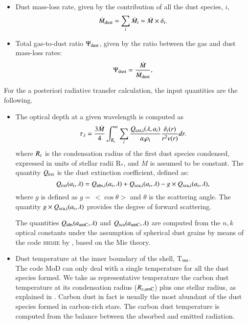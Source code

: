 \documentclass[useAMS,usenatbib]{mn2e/mn2e}
\begin{document}
\begin{itemize}
\item Dust mass-loss rate, given by the contribution of all the dust species, $i$,
\begin{equation}\label{d_mloss}
\dot{M}_{\rm dust}=\sum_i \dot{M}_i=\dot{M}\times\delta_i.
\end{equation}
\item Total gas-to-dust ratio $\Psi_{\rm dust}$, given by the ratio between the gas and dust mass-loss rates:
\begin{equation}\label{psi_dust}
\Psi_{\rm dust}=\frac{\dot{M}}{\dot{M}_{\rm dust}},
\end{equation}
\end{itemize}
\vskip 3mm
For the a posteriori radiative transfer calculation, the input quantities are the following.
\begin{itemize}
\item The optical depth at a given wavelength is computed as
\begin{equation}\label{tau_lambda}
\tau_\lambda=\frac{3\dot{M}}{4}\int_{R_{\rm c}}^{\infty} \sum_i \frac{Q_{\rm ext, i}(\lambda,a_i)}{a_i \rho_{\rm i}}\frac{\delta_i(r)}{r^2 v(r)}dr.
\end{equation}
%
where $R_{\rm c}$ is the condensation radius of the first dust species condensed, expressed in units of stellar radii R$_*$, and $\dot{M}$ is assumed to be constant.
The quantity $Q_{\rm ext}$ is the dust extinction coefficient, defined as:
\begin{equation}
Q_{\rm ext}(a_{\rm i}, \lambda)= Q_{\rm abs, i}(a_{\rm i},\lambda)+ Q_{\rm sca, i}(a_{\rm i}, \lambda) -g \times Q_{\rm sca, i}(a_{\rm i}, \lambda),
\end{equation}
%
where $g$ is defined as $g=$\,$<\cos\theta>$ and $\theta$ is the scattering angle. The quantity $g \times Q_{\rm sca, i}(a_{\rm i}, \lambda)$ provides the degree of forward scattering.

The quantities $Q_{\rm abs}(a_{\rm amC}, \lambda)$ and $Q_{\rm sca}(a_{\rm amC}, \lambda)$ are computed from the $n, k$ optical constants under the assumption of spherical dust grains by means of the code \textsc{bhmie} by \citet{Bohren83}, based on the Mie theory.

\item Dust temperature at the inner boundary of the shell, T$_{\rm inn}$.\\
The code MoD can only deal with a single temperature for all the dust species formed.
We take as representative temperature the carbon dust temperature at its condensation radius ($R_{\rm c, amC}$) plus one stellar radius, as explained in \citet{Nanni16}. Carbon dust in fact is usually the most abundant of the dust species formed in carbon-rich stars.
The carbon dust temperature is computed from the balance between the absorbed and emitted radiation.


\end{itemize}
\end{document}
